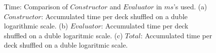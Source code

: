 \documentclass[twoside,11pt,openright]{report}
\begin{document}
\begin{figure}
    \vspace*{0cm}

    \begin{subfigure}{\textwidth}
        \centering
        \caption{}
        \label{fig:total_ms_plot}
    \end{subfigure}

    \caption{Time: Comparison of $Constructor$ and $Evaluator$ in $ms$'s used. (a) $Constructor$: Accumulated time per deck shuffled on a duble logarithmic scale. (b) $Evaluator$: Accumulated time per deck shuffled on a duble logaritmic scale. (c) $Total$: Accumulated time per deck shuffled on a duble logaritmic scale.}
    \label{fig:mesurement_ms}
\end{figure}
\end{document}
